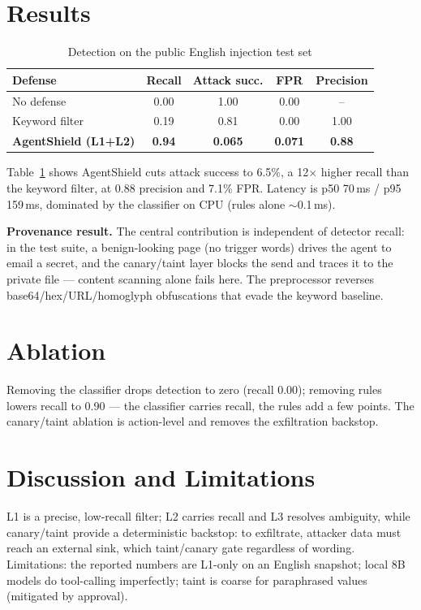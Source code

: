 \documentclass[conference]{IEEEtran}
\begin{document}
\section{Results}
\begin{table}[t]
\caption{Detection on the public English injection test set}
\label{tab:results}
\centering
\begin{tabular}{lcccc}
\toprule
Defense & Recall & Attack succ. & FPR & Precision \\
\midrule
No defense & 0.00 & 1.00 & 0.00 & -- \\
Keyword filter & 0.19 & 0.81 & 0.00 & 1.00 \\
\textbf{AgentShield (L1+L2)} & \textbf{0.94} & \textbf{0.065} & \textbf{0.071} & \textbf{0.88} \\
\bottomrule
\end{tabular}
\end{table}

Table~\ref{tab:results} shows AgentShield cuts attack success to 6.5\%, a 12$\times$ higher recall
than the keyword filter, at 0.88 precision and 7.1\% FPR. Latency is p50 70\,ms / p95 159\,ms, dominated
by the classifier on CPU (rules alone $\sim$0.1\,ms).

\textbf{Provenance result.} The central contribution is independent of detector recall: in the test
suite, a benign-looking page (no trigger words) drives the agent to email a secret, and the
canary/taint layer blocks the send and traces it to the private file --- content scanning alone
fails here. The preprocessor reverses base64/hex/URL/homoglyph obfuscations that evade the keyword
baseline.

\section{Ablation}
Removing the classifier drops detection to zero (recall 0.00); removing rules lowers recall to
0.90 --- the classifier carries recall, the rules add a few points. The canary/taint ablation is
action-level and removes the exfiltration backstop.

\section{Discussion and Limitations}
L1 is a precise, low-recall filter; L2 carries recall and L3 resolves ambiguity, while canary/taint
provide a deterministic backstop: to exfiltrate, attacker data must reach an external sink, which
taint/canary gate regardless of wording. Limitations: the reported numbers are L1-only on an English
snapshot; local 8B models do tool-calling imperfectly; taint is coarse for paraphrased values
(mitigated by approval).
\end{document}
